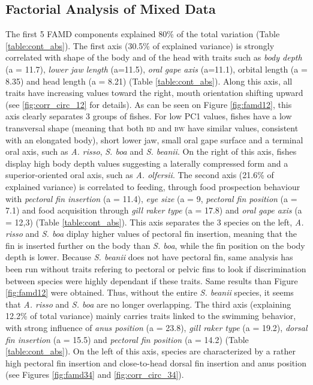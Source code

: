 
\subsection{Factorial Analysis of Mixed Data}

The first 5 FAMD components explained 80\% of the total variation (Table \ref{table:cont_abs}). The first axis (30.5\% of explained variance) is strongly correlated with shape of the body and of the head with traits such as \emph{body depth} (a = 11.7), \emph{lower jaw length} (a=11.5), \emph{oral gape axis} (a=11.1), orbital length (a = 8.35) and head length (a = 8.21) (Table \ref{table:cont_abs}). Along this axis, all traits have increasing values toward the right, mouth orientation shifting upward (see \ref{fig:corr_circ_12} for details). As can be seen on Figure \ref{fig:famd12}, this axis clearly separates 3 groups of fishes. For low PC1 values, fishes have a low transversal shape (meaning that both \textsc{bd} and \textsc{bw} have similar values, consistent with an elongated body), short lower jaw, small oral gape surface and a terminal oral axis, such as \textit{A. risso}, \textit{S. boa} and \textit{S. beanii}. On the right of this axis, fishes display high body depth values suggesting a laterally compressed form and a superior-oriented oral axis, such as \textit{A. olfersii}. 
The second axis (21.6\% of explained variance) is correlated to feeding, through food prospection behaviour with \emph{pectoral fin insertion} (a = 11.4), \emph{eye size} (a = 9, \emph{pectoral fin position} (a = 7.1) and food acquisition through \emph{gill raker type} (a = 17.8) and \emph{oral gape axis} (a = 12,3) (Table \ref{table:cont_abs}). This axis separates the 3 species on the left, \textit{A. risso} and \textit{S. boa} diplay higher values of pectoral fin insertion, meaning that the fin is inserted further on the body than \textit{S. boa}, while the fin position on the body depth is lower. Because \textit{S. beanii} does not have pectoral fin, same analysis has been run without traits refering to pectoral or pelvic fins to look if discrimination between species were highly dependant if these traits. Same results than Figure \ref{fig:famd12} were obtained. Thus, without the entire \textit{S. beanii} species, it seems that \textit{A. risso} and \textit{S. boa} are no longer overlapping. 
The third axis (explaining 12.2\% of total variance) mainly carries traits linked to the swimming behavior, with strong influence of \emph{anus position} (a = 23.8), \emph{gill raker type} (a = 19.2), \emph{dorsal fin insertion} (a = 15.5) and \emph{pectoral fin position} (a = 14.2) (Table \ref{table:cont_abs}). On the left of this axis, species are characterized by a rather high pectoral fin insertion and close-to-head dorsal fin insertion and anus position (see Figures \ref{fig:famd34} and \ref{fig:corr_circ_34}).

